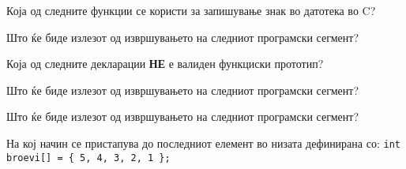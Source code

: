 \documentclass[11pt]{examdesign}
\begin{document}


\begin{multiplechoice}[title={},suppressprefix=yes]

\begin{question}
Која од следните функции се користи за запишување знак во датотека во C?
\end{question}

\begin{question}
Што ќе биде излезот од извршувањето на следниот програмски сегмент?
\end{question}

\begin{question}
Која од следните декларации \textbf{НЕ} е валиден функциски прототип?
\end{question}

\begin{question}

Што ќе биде излезот од извршувањето на следниот програмски сегмент?
\end{question}

\begin{question}
Што ќе биде излезот од извршувањето на следниот програмски сегмент?
\end{question}

\begin{question}
На кој начин се пристапува до последниот елемент во низата дефинирана со: 
\texttt{int broevi[] = \{ 5, 4, 3, 2, 1 \};}
\end{question}


\end{multiplechoice}
\end{document}
